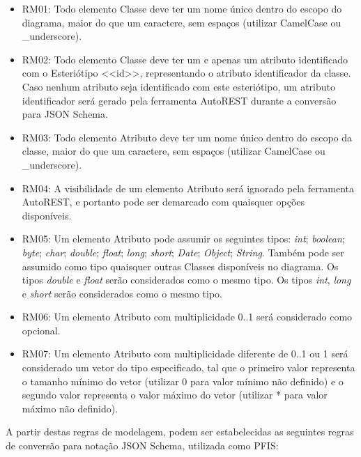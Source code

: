 \begin{itemize}
    \item RM01: Todo elemento Classe deve ter um nome único dentro do escopo do diagrama, maior do que um caractere, sem espaços (utilizar CamelCase ou \_underscore).
    
    \item RM02: Todo elemento Classe deve ter um e apenas um atributo identificado com o Esteriótipo <<id>>, representando o atributo identificador da classe. Caso nenhum atributo seja identificado com este esteriótipo, um atributo identificador será gerado pela ferramenta AutoREST durante a conversão para JSON Schema.
    
    \item RM03: Todo elemento Atributo deve ter um nome único dentro do escopo da classe, maior do que um caractere, sem espaços (utilizar CamelCase ou \_underscore).
    
    \item RM04: A visibilidade de um elemento Atributo será ignorado pela ferramenta AutoREST, e portanto pode ser demarcado com quaisquer opções disponíveis.
    
    \item RM05: Um elemento Atributo pode assumir os seguintes tipos: \textit{int}; \textit{boolean}; \textit{byte}; \textit{char}; \textit{double}; \textit{float}; \textit{long}; \textit{short}; \textit{Date}; \textit{Object}; \textit{String}. Também pode ser assumido como tipo quaisquer outras Classes disponíveis no diagrama. Os tipos \textit{double} e \textit{float} serão considerados como o mesmo tipo. Os tipos \textit{int}, \textit{long} e \textit{short} serão considerados como o mesmo tipo.
    
    \item RM06: Um elemento Atributo com multiplicidade 0..1 será considerado como opcional.
    
    \item RM07: Um elemento Atributo com multiplicidade diferente de 0..1 ou 1 será considerado um vetor do tipo especificado, tal que o primeiro valor representa o tamanho mínimo do vetor (utilizar 0 para valor mínimo não definido) e o segundo valor representa o valor máximo do vetor (utilizar * para valor máximo não definido).
\end{itemize}

A partir destas regras de modelagem, podem ser estabelecidas as seguintes regras de conversão para notação JSON Schema, utilizada como PFIS:

